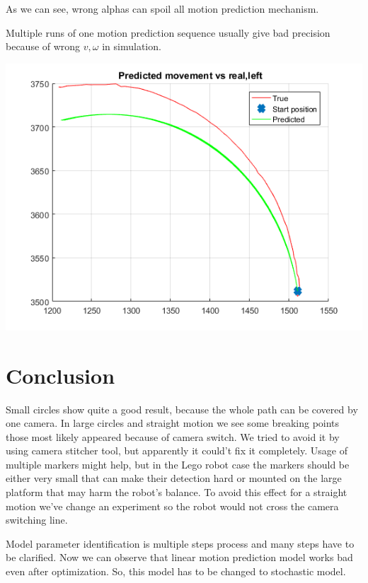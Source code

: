 \documentclass[a4paper, 12pt]{article}
\begin{document}
As we can see, wrong alphas can spoil all motion prediction mechanism.


Multiple runs of one motion prediction sequence usually give bad precision because of wrong $v,\omega$ in simulation. 

\includegraphics[scale = 1]{scatter.png}

\section{Conclusion}

Small circles show quite a good result, because the whole path can be covered by one camera. In large circles and straight motion we see some breaking points those most likely appeared because of camera switch. We tried to avoid it by using camera stitcher tool, but apparently it could't fix it completely. Usage of multiple markers might help, but in the Lego robot case the markers should be either very small that can make their detection hard or mounted on the large platform that may harm the robot's balance. To avoid this effect for a straight motion we've change an experiment so the robot would not cross the camera switching line.

\bigskip

Model parameter identification is multiple steps process and many steps have to be clarified. Now we can observe that linear motion prediction model works bad even after optimization. So, this model has to be changed to stochastic model.
\end{document}
